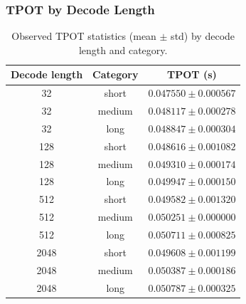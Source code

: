 \documentclass[11pt,a4paper]{article}
\begin{document}
    \subsubsection{TPOT by Decode Length}
    \begin{table}[H]
    \centering
    \small
    \setlength{\tabcolsep}{4pt}
    \begin{tabularx}{\textwidth}{c|c|c}
        \toprule
        Decode length & Category & TPOT (s) \\
        \midrule
        32   & short  & $0.047550 \pm 0.000567$ \\
        32   & medium & $0.048117 \pm 0.000278$ \\
        32   & long   & $0.048847 \pm 0.000304$ \\
        128  & short  & $0.048616 \pm 0.001082$ \\
        128  & medium & $0.049310 \pm 0.000174$ \\
        128  & long   & $0.049947 \pm 0.000150$ \\
        512  & short  & $0.049582 \pm 0.001320$ \\
        512  & medium & $0.050251 \pm 0.000000$ \\
        512  & long   & $0.050711 \pm 0.000825$ \\
        2048 & short  & $0.049608 \pm 0.001199$ \\
        2048 & medium & $0.050387 \pm 0.000186$ \\
        2048 & long   & $0.050787 \pm 0.000325$ \\
        \bottomrule
    \end{tabularx}
    \caption{Observed TPOT statistics (mean $\pm$ std) by decode length and category.}
    \label{tab:model_deepdive_tpot_decode_length}
    \end{table}
\end{document}
